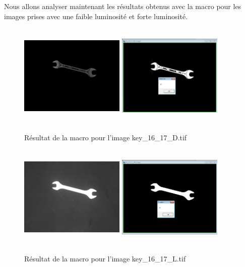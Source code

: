\documentclass{scrreprt}
\begin{document}
\newpage
Nous allons analyser maintenant les résultats obtenus avec la macro pour les images prises avec une faible luminosité et
forte luminosité.

\begin{figure}[!h]
\centering
\includegraphics[width=5cm, height=5cm]{images/key1617D.png}\hfill
\includegraphics[width=5cm, height=5cm]{images/key16dark.png}
\caption{Résultat de la macro pour l'image key_16_17_D.tif}
\end{figure}

\begin{figure}[!h]
\centering
\includegraphics[width=5cm, height=5cm]{images/key1617L.png}\hfill
\includegraphics[width=5cm, height=5cm]{images/key16light.png}
\caption{Résultat de la macro pour l'image key_16_17_L.tif}
\end{figure}
\end{document}
